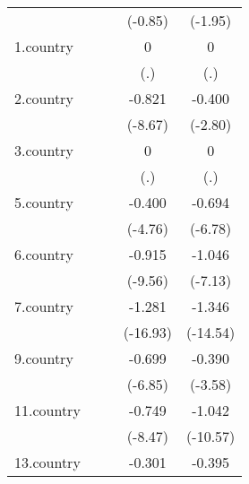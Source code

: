{\begin{tabular}{l*{4}{c}}
            &                     &                     &     (-0.85)         &     (-1.95)         \\
[1em]
1.country   &                     &                     &           0         &           0         \\
            &                     &                     &         (.)         &         (.)         \\
[1em]
2.country   &                     &                     &      -0.821\sym{***}&      -0.400\sym{**} \\
            &                     &                     &     (-8.67)         &     (-2.80)         \\
[1em]
3.country   &                     &                     &           0         &           0         \\
            &                     &                     &         (.)         &         (.)         \\
[1em]
5.country   &                     &                     &      -0.400\sym{***}&      -0.694\sym{***}\\
            &                     &                     &     (-4.76)         &     (-6.78)         \\
[1em]
6.country   &                     &                     &      -0.915\sym{***}&      -1.046\sym{***}\\
            &                     &                     &     (-9.56)         &     (-7.13)         \\
[1em]
7.country   &                     &                     &      -1.281\sym{***}&      -1.346\sym{***}\\
            &                     &                     &    (-16.93)         &    (-14.54)         \\
[1em]
9.country   &                     &                     &      -0.699\sym{***}&      -0.390\sym{***}\\
            &                     &                     &     (-6.85)         &     (-3.58)         \\
[1em]
11.country  &                     &                     &      -0.749\sym{***}&      -1.042\sym{***}\\
            &                     &                     &     (-8.47)         &    (-10.57)         \\
[1em]
13.country  &                     &                     &      -0.301\sym{*}  &      -0.395\sym{**} \\

\end{tabular}}
